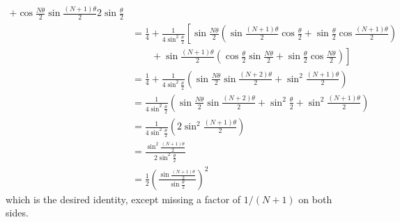 \begin{solution}
\[\begin{aligned}
{            + \cos \frac{N\theta}{2} \sin \frac{(N+1)\theta}{2}}
        {2 \sin \frac{\theta}{2}}
\\
&=\frac{1}{4} + \frac{1}{4 \sin^2 \frac{\theta}{2}} \left[
    \sin \frac{N\theta}{2} \left(
        \sin \frac{(N+1)\theta}{2} \cos \frac{\theta}{2} +
        \sin \frac{\theta}{2} \cos \frac{(N+1)\theta}{2} \right)
\right. \\
&\qquad + \left.
    \sin \frac{(N+1)\theta}{2} \left(
        \cos \frac{\theta}{2} \sin \frac{N\theta}{2} +
        \sin \frac{\theta}{2} \cos \frac{N\theta}{2}
    \right)
 \right] \\
&=\frac{1}{4} + \frac{1}{4 \sin^2 \frac{\theta}{2}} \left(
\sin \frac{N \theta}{2} \sin \frac{(N+2)\theta}{2} + \sin^2 \frac{(N+1)\theta}{2}
    \right) \\
&=\frac{1}{4 \sin^2 \frac{\theta}{2}} \left(
\sin \frac{N \theta}{2} \sin \frac{(N+2)\theta}{2} + \sin^2 \frac{\theta}{2} + \sin^2 \frac{(N+1)\theta}{2}
    \right) \\
&=\frac{1}{4 \sin^2 \frac{\theta}{2}} \left(
2\sin^2 \frac{(N+1)\theta}{2}
    \right) \\
&=\frac{\sin^2 \frac{(N+1)\theta}{2}}{2 \sin^2 \frac{\theta}{2}} \\
&= \frac{1}{2} \left(\frac{\sin \frac{(N+1)\theta}{2}}{\sin \frac{\theta}{2}}\right)^2
\end{aligned} \]
which is the desired identity, except missing a factor of \(1/(N+1)\) on both sides.
\end{solution}
